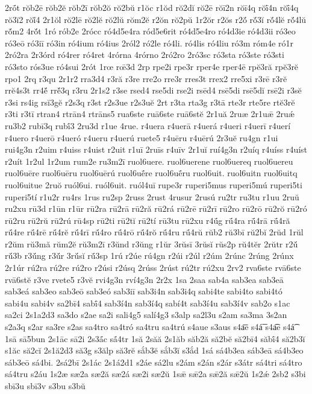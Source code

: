 {2rṓt
rŏb2ē
rŏb2ĕ
rŏb2ī
rŏb2ŏ
rŏ2bŭ
r1ŏc
r1ŏd
rŏ2dĭ
rŏ2ē
rŏī2n
rŏī4q
rŏī́4n
rŏī́4q
rŏ3ĭ2
rŏĭ́4
2r1ŏl
rŏ2lē
rŏ2lĕ
rŏ2lŭ
rŏm2ĕ
r2ŏn
rŏ2pŭ
1r2ŏr
r2ŏs
r2ŏ́
rŏ́3ĭ
rŏ́4lĕ
rŏ́4lŭ
rŏ́m2
4rŏ́t
1ró
rób2e
2rócc
ró4d5e4ra
ród5e6rit
ró4d5e4ro
ró4d3ie
ró4d3ii
ró3eo
ró3eō
ró3iī
ró3in
ró4ium
ró4ius
2ról2
ró2le
ró4li.
ró4lis
ró4liu
ró3m
róm4e
ró1r
2ró2ra
2r3órd
ró4rer
ró4ret
4rórna
4rórno
2ró2ro
2ró3sc
ró3sta
ró3ste
ró3sti
ró3sto
rós3ue
ró4sui
2rót
1rœ
rœ̄3d
2rp
rpe2i
rpe3r
rper4e
rper4ē
rpĕ3ră
rpĕ3rĕ
rpo1
2rq
r3qu
2r1r2
rra3d4
r3ră
r3re
rre2o
rre3r
rres3t
rrex2
rre5xi
r3rē
r3rĕ
rrĕ4s3t
rr4ĕ́
rrĕ́3q
r3ru
2r1s2
r3se
rsed4
rse5di
rse2i
rsēd4
rsē5di
rsē5dĭ
rsē2i
r3sĕ
r3si
rs4ig
rsĭ3gĕ
r2s3q
r3st
r2s3ue
r2s3uĕ
2rt
r3ta
rta3g
r3tā
rte3r
rte5re
rtĕ3rĕ
r3ti
r3tī
rtran4
rtrān4
rtrāns5
rua6ste
ruā6ste
ruā6stĕ
2r1uă
2ruæ
2r1uǣ
2ruǽ
ru3b2
rubī3q
rubī́3
2ru3d
r1ue
4rue.
r4uera
r4uerā
r4uerá
r4ueri
r4uerī
r4uerí
r4uero
r4uerō
r4ueró
r4ueru
r4uerú
ruete5
r4uēru
r4uērú
2r3uĕ
ru4gn
r1ui
rui4g3n
r2uim
r4uiss
r4uist
r2uit
r1uī
2ruīs
r4uīv
2r1uĭ
ruí4g3n
r2uíq
r4uíss
r4uíst
r2uít
1r2ul
1r2um
rum2e
ru3m2ī
ruol6uere.
ruol6uerene
ruol6uereq
ruol6uereu
ruol6uēre
ruol6uēru
ruol6uērú
ruol6uḗre
ruol6uḗru
ruol6uit.
ruol6uitn
ruol6uitq
ruol6uitue
2ruŏ
ruól6ui.
ruól6uit.
ruól4uī
rupe3r
ruperi5mus
ruperi5mú
ruperi5ti
ruperi5tí
r1u2r
ru4rs
1rus
ru2sp
2russ
2rust
4rusur
2rusú
ru2tr
ru3tu
r1uu
2ruŭ
ru2xu
rū3d
r1ūn
r1ūr
rū2ra
rū2rā
rū2ră
rū2rá
rū2rē
rū2rī
rū2ro
rū2rō
rū2rŏ
rū2ró
rū2ru
rū2rŭ
rū2rú
rū4sp
rū2ti
rū2tĭ
rū2tí
rū3tu
rū2xu
r4ū́g
rū́4ra
rū́4rā
rū́4ră
rū́4re
rū́4rē
rū́4rĕ
rū́4rī
rū́4ro
rū́4rō
rū́4rŏ
rū́4ru
rū́4rŭ
rŭb2
rŭ3bī
rŭ2bĭ
2rŭd
1rŭl
r2ŭm
rŭ3mă
rŭm2ĕ
rŭ3m2ī
r3ŭnd
r3ŭng
r1ŭr
3rŭsī
3rŭsĭ
rŭs2p
rŭ4tĕr
2rŭtr
r2ŭ́
rŭ́3b
r3ŭ́ng
r3ŭ́r
3rŭ́sĭ
rŭ́3sp
1rú
r2úe
rú4gn
r2úi
r2úl
r2úm
2rúnc
2rúng
2rúnx
2r1úr
rú2ra
rú2re
rú2ro
r2úsi
r2úsq
2rúss
2rúst
rú2tr
rú2xu
2rv2
rva6ste
rvā6ste
rvā6stĕ
r3ve
rvete5
r3vĕ
rvi4g3n
rví4g3n
2r2x
1sa
2saa
sab4a
sab3ea
sab3eā
sab3eá
sab3eo
sab3eō
sab3eó
sab3iī
sab3i4n
sab3i4q
sabi4te
sabi4to
sabi4tó
sabi4u
sabi4v
sa2bī4
sabī́4
sab3í4n
sab3í4q
sabí4t
sab3í4u
sab3í4v
sab2o
s1ac
sa2ci
2s1a2d3
sa3do
s2ae
sa2i
sali4g5
salí4g3
s3alp
sa2l3u
s2am
sa3ma
3s2an
s2a3q
s2ar
sa3re
s2as
sa4tro
sa4tró
sa4tru
sa4trú
s4aue
s3aus
s4a͞e
s4á͞
s4a͡e
s4á͡
1sā
sā5bun
2s1āc
sā2i
2s3ā́c
sā́4tr
1să
2săă
2s1ăb
săb2ă
să2bĕ
să2bī4
săbī́4
să2b3ĭ
s1ăc
să2cĭ
2s1ă2d3
să3g
s3ălp
să3rĕ
sắb3ĕ
sắb3ĭ
s3ắd
1sá
sá4b3ea
sáb3eā
sá4b3eo
sáb3eō
sá4bi.
2sá2bī
2s1ác
2s1á2d1
s2áe
sá2lu
s2ám
s2án
s2ár
s3átr
sá4tri
sá4tro
sá4tru
s2áu
1s2æ
sæ2a
sæ2ă
sæ2á
sæ2i
sæ2ŭ
1sǣ
sǣ2a
sǣ2ă
sǣ2ŭ
1s2ǽ
2sb2
s3bi
sbī3u
sbī3v
s3bu
s3bŭ
}
